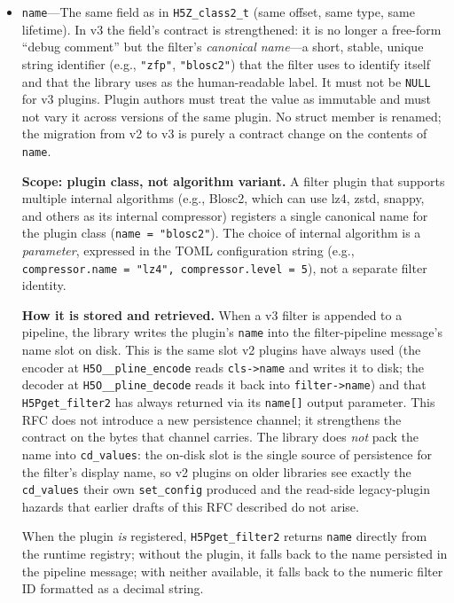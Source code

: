 \documentclass[../RFC-HDFG-2026-001.tex]{subfiles}
\begin{document}
\begin{itemize}
\item \texttt{name}---The same field as in \texttt{H5Z\_class2\_t}
  (same offset, same type, same lifetime).  In v3 the field's
  contract is strengthened: it is no longer a free-form ``debug
  comment'' but the filter's \emph{canonical name}---a short, stable,
  unique string identifier (e.g., \texttt{"zfp"}, \texttt{"blosc2"})
  that the filter uses to identify itself and that the library uses
  as the human-readable label.  It must not be \texttt{NULL} for v3
  plugins.  Plugin authors must treat the value as immutable and must
  not vary it across versions of the same plugin.  No struct member
  is renamed; the migration from v2 to v3 is purely a contract change
  on the contents of \texttt{name}.

  \textbf{Scope: plugin class, not algorithm variant.}  A filter plugin
  that supports multiple internal algorithms (e.g., Blosc2, which can use
  lz4, zstd, snappy, and others as its internal compressor) registers a
  single canonical name for the plugin class (\texttt{name = "blosc2"}).
  The choice of internal algorithm is a \emph{parameter}, expressed in
  the TOML configuration string (e.g.,
  \texttt{compressor.name = "lz4", compressor.level = 5}), not a separate
  filter identity.

  \textbf{How it is stored and retrieved.}  When a v3 filter is appended
  to a pipeline, the library writes the plugin's \texttt{name} into the
  filter-pipeline message's name slot on disk.  This is the same slot
  v2 plugins have always used (the encoder at
  \texttt{H5O\_\_pline\_encode} reads \texttt{cls->name} and writes it
  to disk; the decoder at \texttt{H5O\_\_pline\_decode} reads it back
  into \texttt{filter->name}) and that \texttt{H5Pget\_filter2} has
  always returned via its \texttt{name[]} output parameter.  This RFC
  does not introduce a new persistence channel; it strengthens the
  contract on the bytes that channel carries.  The library does
  \emph{not} pack the name into \texttt{cd\_values}: the on-disk slot
  is the single source of persistence for the filter's display name,
  so v2 plugins on older libraries see exactly the \texttt{cd\_values}
  their own \texttt{set\_config} produced and the read-side
  legacy-plugin hazards that earlier drafts of this RFC described do
  not arise.

  When the plugin \emph{is} registered, \texttt{H5Pget\_filter2}
  returns \texttt{name} directly from the runtime registry; without
  the plugin, it falls back to the name persisted in the pipeline
  message; with neither available, it falls back to the numeric
  filter ID formatted as a decimal string.


\end{itemize}
\end{document}
